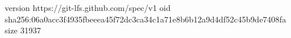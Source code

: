 version https://git-lfs.github.com/spec/v1
oid sha256:06a0acc3f4935fbeeea45f72dc3ca34c1a71e8b6b12a9d4df52c45b9de7408fa
size 31937
